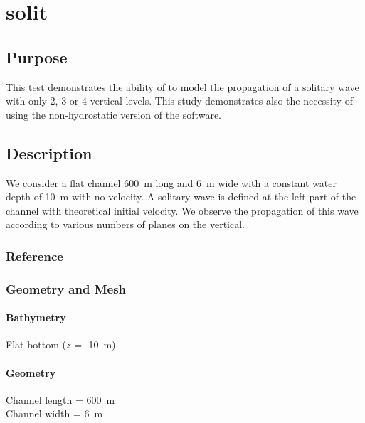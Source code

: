 \chapter{solit}
%
%
\section{Purpose}
%
This test demonstrates the ability of  to model the
propagation of a solitary wave with only 2, 3 or 4 vertical levels.
This study demonstrates also the necessity of using the non-hydrostatic
version of the software.
%
\section{Description}
%
We consider a flat channel 600~m long and 6~m wide with a constant water
depth of 10~m with no velocity.
A solitary wave is defined at the left part of the channel with
theoretical initial velocity.
We observe the propagation of this wave according to various numbers of
planes on the vertical.
%
%
%
%
\subsection{Reference}
%

%
%
%
\subsection{Geometry and Mesh}
%
\subsubsection{Bathymetry}
%
Flat bottom ($z$ = -10~m)
%
\subsubsection{Geometry}
%
Channel length = 600~m\\
Channel width = 6~m
%
